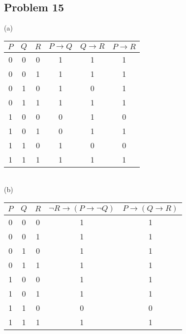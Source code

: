 \documentclass{article}
\begin{document}
\subsection{Problem 15}
(a)
\begin{table}[h!]
\begin{tabular}{c|c|c|c|c|c}
$P$ & $Q$ & $R$ & $P \rightarrow Q$ & $Q \rightarrow R$ & $P\rightarrow R$\\\hline
0 & 0 & 0 & 1 & 1 & 1\\
0 & 0 & 1 & 1 & 1 & 1\\
0 & 1 & 0 & 1 & 0 & 1\\
0 & 1 & 1 & 1 & 1 & 1\\
1 & 0 & 0 & 0 & 1 & 0\\
1 & 0 & 1 & 0 & 1 & 1\\
1 & 1 & 0 & 1 & 0 & 0\\
1 & 1 & 1 & 1 & 1 & 1
\end{tabular}
\end{table}\\
(b)
\begin{table}[h!]
\begin{tabular}{c|c|c|c|c}
$P$ & $Q$ & $R$ & $\lnot R \rightarrow (P \rightarrow \lnot Q)$ & $P \rightarrow (Q \rightarrow R)$ \\\hline
0 & 0 & 0 & 1 & 1\\
0 & 0 & 1 & 1 & 1\\
0 & 1 & 0 & 1 & 1\\
0 & 1 & 1 & 1 & 1\\
1 & 0 & 0 & 1 & 1\\
1 & 0 & 1 & 1 & 1\\
1 & 1 & 0 & 0 & 0\\
1 & 1 & 1 & 1 & 1
\end{tabular}
\end{table}
\newpage
\end{document}
